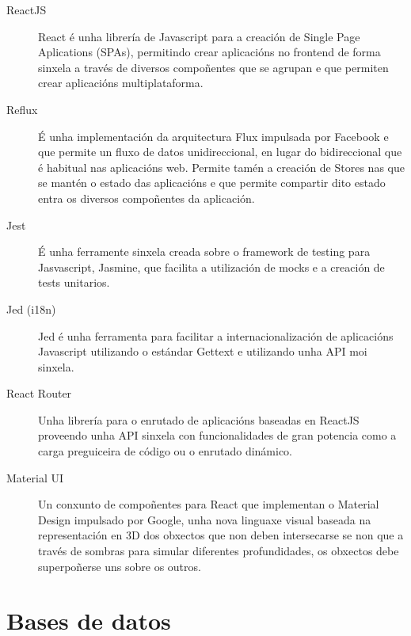   \begin{description}
   \item [ReactJS] React é unha librería de Javascript para a creación de Single Page
Aplications (SPAs), permitindo crear aplicacións no frontend de forma sinxela a través de
diversos compoñentes que se agrupan e que permiten crear aplicacións multiplataforma.

   \item [Reflux] É unha implementación da arquitectura Flux impulsada por Facebook e que
permite un fluxo de datos unidireccional, en lugar do bidireccional que é habitual nas
aplicacións web.
    Permite tamén a creación de Stores nas que se mantén o estado das aplicacións e que
permite compartir dito estado entra os diversos compoñentes da aplicación.

   \item [Jest] É unha ferramente sinxela creada sobre o framework de testing
para Jasvascript, Jasmine, que facilita a utilización de mocks e a creación de
tests unitarios.

   \item [Jed (i18n)] Jed é unha ferramenta para facilitar a internacionalización de
aplicacións Javascript utilizando o estándar Gettext e utilizando unha API moi sinxela.

   \item [React Router] Unha librería para o enrutado de aplicacións baseadas en ReactJS
proveendo unha API sinxela con funcionalidades de gran potencia como a carga preguiceira
de código ou o enrutado dinámico.

   \item [Material UI] Un conxunto de compoñentes para React que implementan o Material
Design impulsado por Google, unha nova linguaxe visual baseada na representación en 3D
dos obxectos que non deben intersecarse se non que a través de sombras para simular
diferentes profundidades, os obxectos debe superpoñerse uns sobre os outros.

  \end{description}

  \section{Bases de datos}

